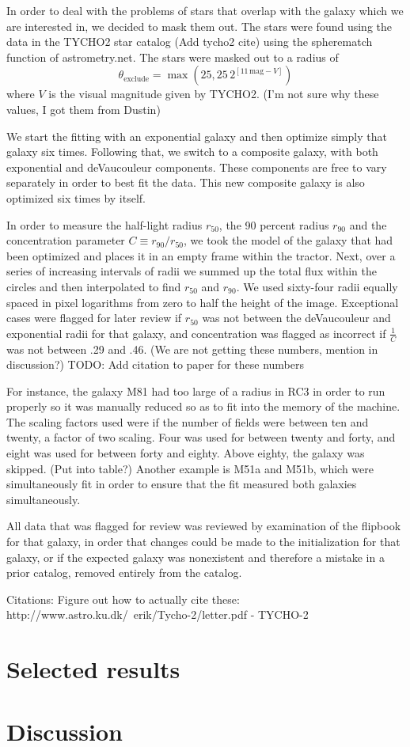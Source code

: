 \documentclass[12pt,preprint,dvipdf]{aastex}
\newcommand{\units}[1]{\mathrm{#1}}
\renewcommand{\mag}{\units{mag}}
\newcommand{\rfifty}{r_{50}}
\newcommand{\rninety}{r_{90}}
\newcommand{\conc}{C}
\begin{document}
In order to deal with the problems of stars that overlap with the
galaxy which we are interested in, we decided to mask them out. The
stars were found using the data in the TYCHO2 star catalog (Add tycho2 cite)
 using the spherematch function of astrometry.net. The stars were masked out to a
radius of
\begin{equation}
\theta_{\mathrm{exclude}} = \max(25, 25\,2^{[11\,\mag-V]})
\end{equation}
where $V$ is the visual magnitude given by TYCHO2.
(I'm not sure why these values, I got them from Dustin)



We start the fitting with an exponential galaxy and then optimize
simply that galaxy six times. Following that, we switch to a composite
galaxy, with both exponential and deVaucouleur components. These
components are free to vary separately in order to best fit the
data. This new composite galaxy is also optimized six times by itself.

In order to measure the half-light radius $\rfifty$, the 90 percent
radius $\rninety$ and the concentration parameter $\conc\equiv
\rninety/\rfifty$, we took the model of the galaxy that had been
optimized and places it in an empty frame within the tractor. Next,
over a series of increasing intervals of radii we summed up the total
flux within the circles and then interpolated to find $\rfifty$ and $\rninety$. We used sixty-four radii equally spaced in pixel logarithms from zero to half the height of the image.
Exceptional cases were flagged for later review if $\rfifty$ was not between the deVaucouleur and exponential radii for that galaxy, and concentration was flagged as incorrect if $\frac{1}{\conc}$ was not between .29 and .46. (We are not getting these numbers, mention in discussion?) TODO: Add citation to paper for these numbers

For instance, the galaxy M81 had too large of a radius in RC3 in order to run properly so it was manually reduced so as to fit into the memory of the machine. The scaling factors used were if the number of fields were between ten and twenty, a factor of two scaling. Four was used for between twenty and forty, and eight was used for between forty and eighty. Above eighty, the galaxy was skipped. (Put into table?) Another example is M51a and M51b, which were simultaneously fit in order to ensure that the fit measured both galaxies simultaneously. 

All data that was flagged for review was reviewed by examination of the flipbook for that galaxy, in order that changes could be made to the initialization for that galaxy, or if the expected galaxy was nonexistent and therefore a mistake in a prior catalog, removed entirely from the catalog. 



Citations: Figure out how to actually cite these:
http://www.astro.ku.dk/~erik/Tycho-2/letter.pdf  - TYCHO-2

\section{Selected results}

\section{Discussion}
\end{document}
